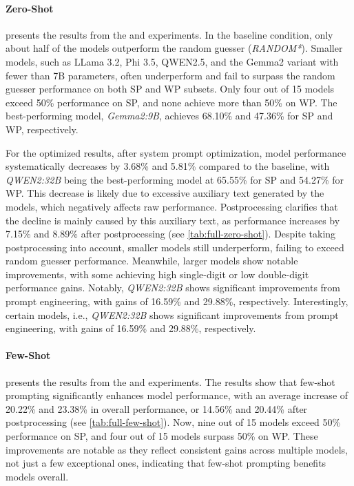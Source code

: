 \paragraph{Zero-Shot}

 presents the results from the  and  experiments. In the baseline condition, only about half of the models outperform the random guesser (\textit{RANDOM*}). Smaller models, such as LLama 3.2, Phi 3.5, QWEN2.5, and the Gemma2 variant with fewer than 7B parameters, often underperform and fail to surpass the random guesser performance on both \ac{SP} and \ac{WP} subsets. Only four out of 15 models exceed 50\% performance on \ac{SP}, and none achieve more than 50\% on \ac{WP}. The best-performing model, \textit{Gemma2:9B}, achieves 68.10\% and 47.36\% for \ac{SP} and \ac{WP}, respectively.

For the optimized results, after system prompt optimization, model performance systematically decreases by 3.68\% and 5.81\% compared to the baseline, with \textit{QWEN2:32B} being the best-performing model at 65.55\% for \ac{SP} and 54.27\% for \ac{WP}. This decrease is likely due to excessive auxiliary text generated by the models, which negatively affects raw performance. Postprocessing clarifies that the decline is mainly caused by this auxiliary text, as performance increases by 7.15\% and 8.89\% after postprocessing (see \cref{tab:full-zero-shot}). Despite taking postprocessing into account, smaller models still underperform, failing to exceed random guesser performance. Meanwhile, larger models show notable improvements, with some achieving high single-digit or low double-digit performance gains. Notably, \textit{QWEN2:32B} shows significant improvements from prompt engineering, with gains of 16.59\% and 29.88\%, respectively. Interestingly, certain models, i.e., \textit{QWEN2:32B} shows significant improvements from prompt
engineering, with gains of 16.59\% and 29.88\%, respectively.

\paragraph{Few-Shot}

 presents the results from the  and  experiments. The results show that few-shot prompting significantly enhances model performance, with an average increase of 20.22\% and 23.38\% in overall performance, or 14.56\% and 20.44\% after postprocessing (see \cref{tab:full-few-shot}). Now, nine out of 15 models exceed 50\% performance on \ac{SP}, and four out of 15 models surpass 50\% on \ac{WP}. These improvements are notable as they reflect consistent gains across multiple models, not just a few exceptional ones, indicating that few-shot prompting benefits models overall.

